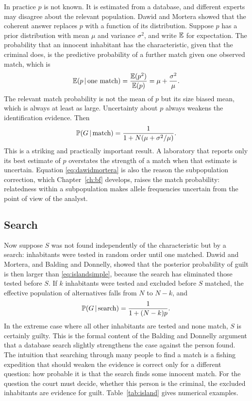 In practice $p$ is not known. It is estimated from a database, and different experts may disagree about the relevant population. Dawid and Mortera showed that the coherent answer replaces $p$ with a function of its distribution. Suppose $p$ has a prior distribution with mean $\mu$ and variance $\sigma^2$, and write $\mathbb{E}$ for expectation. The probability that an innocent inhabitant has the characteristic, given that the criminal does, is the predictive probability of a further match given one observed match, which is
\begin{equation}
\mathbb{E}(p\,\vert\, \text{one match}) = \frac{\mathbb{E}(p^2)}{\mathbb{E}(p)} = \mu + \frac{\sigma^2}{\mu}.
\label{eq:dawidmortera}
\end{equation}
The relevant match probability is not the mean of $p$ but its size biased mean, which is always at least as large. Uncertainty about $p$ always weakens the identification evidence. Then
\begin{equation}
\mathbb{P}(G\,\vert\, \text{match}) = \frac{1}{1 + N(\mu + \sigma^2/\mu)} .
\end{equation}
This is a striking and practically important result. A laboratory that reports only its best estimate of $p$ overstates the strength of a match when that estimate is uncertain. Equation \eqref{eq:dawidmortera} is also the reason the subpopulation correction, which Chapter~\ref{ch:bf} develops, raises the match probability: relatedness within a subpopulation makes allele frequencies uncertain from the point of view of the analyst.

\subsection{Search}

Now suppose $S$ was not found independently of the characteristic but by a search: inhabitants were tested in random order until one matched. Dawid and Mortera, and Balding and Donnelly, showed that the posterior probability of guilt is then larger than \eqref{eq:islandsimple}, because the search has eliminated those tested before $S$. If $k$ inhabitants were tested and excluded before $S$ matched, the effective population of alternatives falls from $N$ to $N - k$, and
\begin{equation}
\mathbb{P}(G\,\vert\, \text{search}) = \frac{1}{1 + (N-k)p}.
\end{equation}
In the extreme case where all other inhabitants are tested and none match, $S$ is certainly guilty. This is the formal content of the Balding and Donnelly argument that a database search slightly strengthens the case against the person found. The intuition that searching through many people to find a match is a fishing expedition that should weaken the evidence is correct only for a different question: how probable it is that the search finds some innocent match. For the question the court must decide, whether this person is the criminal, the excluded inhabitants are evidence for guilt. Table~\ref{tab:island} gives numerical examples.


